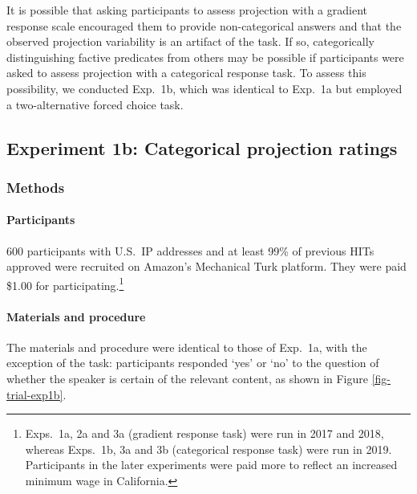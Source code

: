 \documentclass[11pt,fleqn]{article}
\newcommand{\6}{\mbox{$[\hspace*{-.6mm}[$}}
\newcommand{\9}{\mbox{$]\hspace*{-.6mm}]$}}
\begin{document}
It is possible that asking participants to assess projection with a gradient response scale encouraged them to provide non-categorical answers and that the observed projection variability is an artifact of the task. If so, categorically distinguishing factive predicates from others may be possible if participants were asked to assess projection with a categorical response task. To assess this possibility, we conducted Exp.~1b, which was identical to Exp.~1a but employed a two-alternative forced choice task.

\subsection{Experiment 1b: Categorical projection ratings}

\subsubsection{Methods}

\paragraph{Participants} 600 participants with U.S.\ IP addresses and at least 99\% of previous HITs approved were recruited on Amazon's Mechanical Turk platform. They were paid \$1.00 for participating.\footnote{Exps.~1a, 2a and 3a (gradient response task) were run in 2017 and 2018, whereas  Exps.~1b, 3a and 3b (categorical response task) were run in 2019. Participants in the later experiments were paid more to reflect an increased minimum wage in California.}


\paragraph{Materials and procedure} The materials and procedure were identical to those of Exp.~1a, with the exception of the task: participants responded `yes' or `no' to the question of whether the speaker is certain of the relevant content, as shown in Figure \ref{fig-trial-exp1b}.
\end{document}

